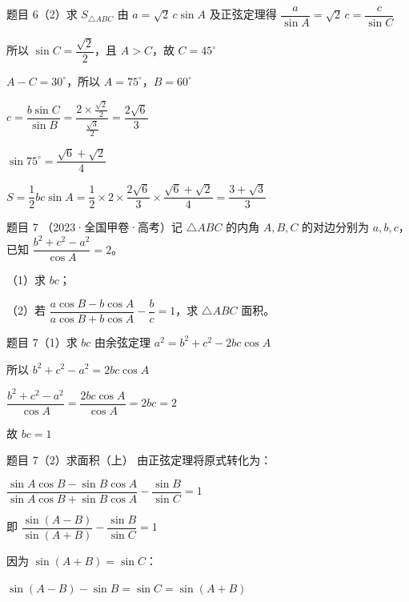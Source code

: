 \documentclass[UTF8]{ctexbeamer}
\begin{document}
	\begin{frame}{题目 6（2）\quad 求 $S_{\triangle ABC}$}
		由 $a = \sqrt{2}\,c\sin A$ 及正弦定理得 $\dfrac{a}{\sin A} = \sqrt{2}\,c = \dfrac{c}{\sin C}$
		\pause
		
		所以 $\sin C = \dfrac{\sqrt{2}}{2}$，且 $A > C$，故 $C = 45^\circ$
		\pause
		
		$A - C = 30^\circ$，所以 $A = 75^\circ$，$B = 60^\circ$
		\pause
		
		$c = \dfrac{b\sin C}{\sin B} = \dfrac{2 \times \frac{\sqrt{2}}{2}}{\frac{\sqrt{3}}{2}} = \dfrac{2\sqrt{6}}{3}$
		\pause
		
		$\sin 75^\circ = \dfrac{\sqrt{6}+\sqrt{2}}{4}$
		\pause
		
		$S = \dfrac{1}{2}bc\sin A = \dfrac{1}{2} \times 2 \times \dfrac{2\sqrt{6}}{3} \times \dfrac{\sqrt{6}+\sqrt{2}}{4} = \dfrac{3+\sqrt{3}}{3}$
	\end{frame}
	
	\begin{frame}{题目 7}
		（2023·全国甲卷·高考）记 $\triangle ABC$ 的内角 $A, B, C$ 的对边分别为 $a, b, c$，已知 $\dfrac{b^2+c^2-a^2}{\cos A} = 2$。
		
		\vspace{0.3cm}
		（1）求 $bc$；
		
		（2）若 $\dfrac{a\cos B - b\cos A}{a\cos B + b\cos A} - \dfrac{b}{c} = 1$，求 $\triangle ABC$ 面积。
	\end{frame}
	
	\begin{frame}{题目 7（1）\quad 求 $bc$}
		由余弦定理 $a^2 = b^2 + c^2 - 2bc\cos A$
		\pause
		
		所以 $b^2 + c^2 - a^2 = 2bc\cos A$
		\pause
		
		$\dfrac{b^2+c^2-a^2}{\cos A} = \dfrac{2bc\cos A}{\cos A} = 2bc = 2$
		\pause
		
		故 $bc = 1$
	\end{frame}
	
	\begin{frame}{题目 7（2）\quad 求面积（上）}
		由正弦定理将原式转化为：
		
		$\dfrac{\sin A\cos B - \sin B\cos A}{\sin A\cos B + \sin B\cos A} - \dfrac{\sin B}{\sin C} = 1$
		\pause
		
		即 $\dfrac{\sin(A-B)}{\sin(A+B)} - \dfrac{\sin B}{\sin C} = 1$
		\pause
		
		因为 $\sin(A+B) = \sin C$：
		\pause
		
		$\sin(A-B) - \sin B = \sin C = \sin(A+B)$
	\end{frame}
	
\end{document}
